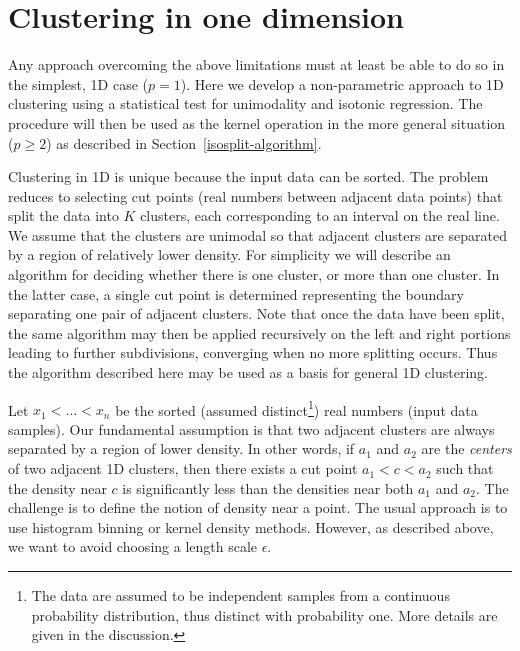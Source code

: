 \documentclass[10pt]{article}
\begin{document}
\section {Clustering in one dimension}
\label{clustering_1d}

Any approach overcoming the above limitations must at least be able to do so in the simplest, 1D case ($p=1$). Here we develop a non-parametric approach to 1D clustering using a statistical test for unimodality and isotonic regression. The procedure will then be used as the kernel operation in the more general situation ($p\geq2$) as described in Section~\ref{isosplit-algorithm}.

Clustering in 1D is unique because the input data can be sorted. The problem reduces to selecting cut points (real numbers between adjacent data points) that split the data into $K$ clusters, each corresponding to an interval on the real line. We assume that the clusters are unimodal so that adjacent clusters are separated by a region of relatively lower density. For simplicity we will describe an algorithm for deciding whether there is one cluster, or more than one cluster. In the latter case, a single cut point is determined representing the boundary separating one pair of adjacent clusters. Note that once the data have been split, the same algorithm may then be applied recursively on the left and right portions leading to further subdivisions, converging when no more splitting occurs. Thus the algorithm described here may be used as a basis for general 1D clustering.

Let $x_1<\dots<x_n$ be the sorted (assumed distinct\footnote{The data are assumed to be independent samples from a continuous probability distribution, thus distinct with probability one. More details are given in the discussion.}) real numbers (input data samples). Our fundamental assumption is that two adjacent clusters are always separated by a region of lower density. In other words, if $a_1$ and $a_2$ are the \emph{centers} of two adjacent 1D clusters, then there exists a cut point $a_1<c<a_2$ such that the density near $c$ is significantly less than the densities near both $a_1$ and $a_2$. The challenge is to define the notion of density near a point. The usual approach is to use histogram binning or kernel density methods. However, as described above, we want to avoid choosing a length scale $\epsilon$.
\end{document}

